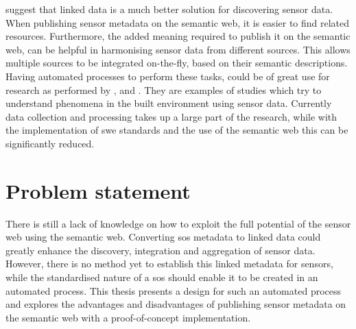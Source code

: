 \citeauthor{SSW:Atkinson} suggest that linked data is a much better solution for discovering sensor data. When publishing sensor metadata on the semantic web, it is easier to find related resources. Furthermore, the added meaning required to publish it on the semantic web, can be helpful in harmonising sensor data from different sources. This allows multiple sources to be integrated on-the-fly, based on their semantic descriptions. Having automated processes to perform these tasks, could be of great use for research as performed by \cite{UC:vanderHoeven}, \cite{UC:Hotterdam} and \cite{UC:Theunisse}. They are examples of studies which try to understand phenomena in the built environment using sensor data. Currently data collection and processing takes up a large part of the research, while with the implementation of \ac{swe} standards and the use of the semantic web this can be significantly reduced.  


\section{Problem statement}
There is still a lack of knowledge on how to exploit the full potential of the sensor web using the semantic web. Converting \ac{sos} metadata to linked data could greatly enhance the discovery, integration and aggregation of sensor data. However, there is no method yet to establish this linked metadata for sensors, while the standardised nature of a \ac{sos} should enable it to be created in an automated process. This thesis presents a design for such an automated process and explores the advantages and disadvantages of publishing sensor metadata on the semantic web with a proof-of-concept implementation. 

